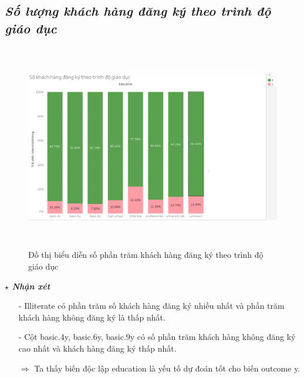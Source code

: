 \documentclass{report}
\begin{document}
\subsection{\textit{Số lượng khách hàng đăng ký theo trình độ giáo dục}}
         \begin{center}
        \begin{figure}[htp]
    	\begin{center}
    		\includegraphics[width=15cm, height=9cm]{images/hinh4.png}
    	\end{center}
    		\caption{Đồ thị biểu diễn số phần trăm khách hàng đăng ký theo trình độ giáo dục}
    \end{figure}
    \end{center}
    \fontsize{13}{14}\selectfont \textbf{$\star$\textit{ Nhận xét}}
    \begin{enumerate}
        \item[- ] Illiterate có phần trăm số khách hàng đăng ký nhiều nhất và phần trăm khách hàng không đăng ký là thấp nhất.
        \item[- ] Cột basic.4y, basic.6y, basic.9y có số phần trăm khách hàng không đăng ký cao nhất và khách hàng đăng ký thấp nhất.
        \item [$\Rightarrow$] Ta thấy biến độc lập education là yếu tố dự đoán tốt cho biến outcome y.
    \end{enumerate}
\pagebreak
\end{document}
